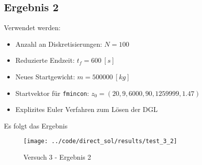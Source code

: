 \newpage
\subsection{Ergebnis 2}
Verwendet werden:
\begin{itemize}
\item Anzahl an Diskretisierungen: $N = 100$ 
\item Reduzierte Endzeit: $t_f = 600 \ [s]$
\item Neues Startgewicht: $m = 500000 \ [kg]$
\item Startvektor für \texttt{fmincon}: $z_0 = (20,9,6000,90,1259999,1.47)$
\item Explizites Euler Verfahren zum Lösen der DGL
\end{itemize}
Es folgt das Ergebnis
\begin{figure}[H]
\begin{center}
\texttt{[image: ../code/direct\_sol/results/test\_3\_2]}
\caption{Versuch 3 - Ergebnis 2}\label{img:test_3_2}
\end{center}
\end{figure}






\newpage

